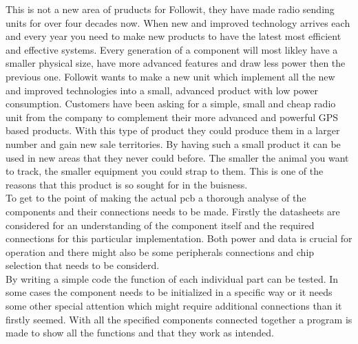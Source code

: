 
This is not a new area of pruducts for Followit, they have made radio sending units for over four decades now.
When new and improved technology arrives each and every year you need to make new products to have the latest most efficient and effective systems. Every generation of a component will most likley have a smaller physical size, have more advanced features and draw less power then the previous one. Followit wants to make a new unit which implement all the new and improved technologies into a small, advanced product with low power consumption. 
Customers have been asking for a simple, small and cheap radio unit from the company to complement their more advanced and powerful GPS based products. With this type of product they could produce them in a larger number and gain new sale territories. By having such a small product it can be used in new areas that they never could before. The smaller the animal you want to track, the smaller equipment you could strap to them. This is one of the reasons that this product is so sought for in the buisness. \\
To get to the point of making the actual \gls{pcb} a thorough analyse of the components and their connections needs to be made. Firstly the datasheets are considered for an understanding of the component itself and the required connections for this particular implementation. Both power and data is crucial for operation and there might also be some peripherals connections and chip selection that needs to be considerd. \\
By writing a simple code the function of each individual part can be tested.  In some cases the component needs to be initialized in a specific way or it needs some other special attention which might require additional connections than it firstly seemed.
With all the specified components connected together a program is made to show all the functions and that they work as intended. 

\thispagestyle{empty}